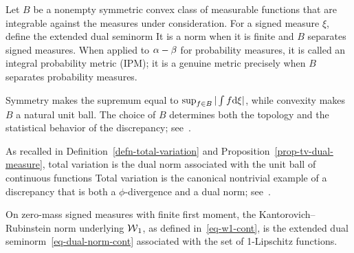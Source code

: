 \begin{defn}\label{def-dual-norm-ipm}
	Let $B$ be a nonempty symmetric convex class of measurable functions that are integrable against the measures under consideration. For a signed measure $\xi$, define the extended dual seminorm
	It is a norm when it is finite and $B$ separates signed measures. When applied to $\alpha-\beta$ for probability measures, it is called an integral probability metric (IPM); it is a genuine metric precisely when $B$ separates probability measures.
\end{defn}
Symmetry makes the supremum equal to $\sup_{f\in B}|\int f\mathrm{d}\xi|$, while convexity makes $B$ a natural unit ball. The choice of $B$ determines both the topology and the statistical behavior of the discrepancy; see~\cite{sriperumbudur2012empirical,sriperumbudur2009integral,sriperumbudur2008injective}.

\begin{example}
As recalled in Definition~\ref{defn-total-variation} and Proposition~\ref{prop-tv-dual-measure}, total variation is the dual norm associated with the unit ball of continuous functions
Total variation is the canonical nontrivial example of a discrepancy that is both a $\phi$-divergence and a dual norm; see~\cite{sriperumbudur2009integral}.
\end{example}

\begin{example}
On zero-mass signed measures with finite first moment, the Kantorovich--Rubinstein norm underlying $\operatorname{\mathcal{W}}_1$, as defined in~\eqref{eq-w1-cont}, is the extended dual seminorm~\eqref{eq-dual-norm-cont} associated with
the set of 1-Lipschitz functions.
\end{example}

